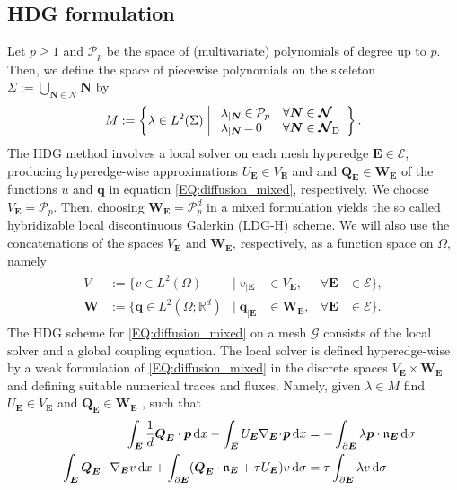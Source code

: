 \documentclass[a4paper, english, 12pt, reqno, draft]{amsart}
\theoremstyle{definition}
\theoremstyle{remark}
\numberwithin{equation}{section}
\newcommand{\Graph}{\ensuremath{\boldsymbol{\mathcal G}}}
\newcommand{\SetEdge}{\ensuremath{\boldsymbol{\mathcal E}}}
\newcommand{\SetNode}{\ensuremath{\boldsymbol{\mathcal N}}}
\newcommand{\SetNodeDir}{\ensuremath{\SetNode_\textup D}}
\newcommand{\Edge}{{\ensuremath{\boldsymbol E}}}
\newcommand{\Node}{{\ensuremath{\boldsymbol N}}}
\newcommand{\Nabla}{\ensuremath{\nabla_\Edge}}
\newcommand{\Div}{\ensuremath{\Nabla\!\cdot\!}}
\newcommand{\Normal}{\ensuremath{\mathfrak n_\Edge}}
\newcommand{\skeletal}{\ensuremath{\Sigma}}
\newcommand{\skeletalSpace}{\ensuremath{M}}
\newcommand{\discElementSpace}{\ensuremath{V}}
\newcommand{\polynomials}{\ensuremath{\mathcal P}}
\renewcommand{\vec}[1]{\ensuremath{\boldsymbol{#1}}}
\newcommand{\dx}{\ensuremath{\, \textup d x}}
\newcommand{\ds}{\ensuremath{\, \textup d \sigma}}
\begin{document}
\subsection{HDG formulation}\label{SEC:HDG_form}
% 
Let $p\ge 1$ and $\polynomials_p$ be the space of (multivariate)
polynomials of degree up to $p$. Then, we define the space of piecewise polynomials on the skeleton $\skeletal := \bigcup_{\Node \in \SetNode} \Node$ by
% 
\begin{gather}\label{EQ:skeletal_space}
 \skeletalSpace := \left\{ \lambda \in L^2(\skeletal) \;\middle|\;
 \begin{array}{r@{\,}c@{\,}ll}
  \lambda_{|\Node} &\in& \polynomials_p & \forall \Node \in \SetNode\\
  \lambda_{|\Node} &=& 0 & \forall \Node \in \SetNodeDir    
 \end{array}
 \right\}.
\end{gather}
% 
The HDG method involves a local solver on each mesh hyperedge $\Edge \in \SetEdge$, producing hyperedge-wise approximations $U_\Edge \in V_\Edge$ and and $\vec Q_\Edge \in \vec W_\Edge$ of the functions $u$ and $\vec q$ in equation \eqref{EQ:diffusion_mixed}, respectively. We choose $V_\Edge = \polynomials_p$. Then, choosing $\vec W_\Edge = \polynomials_p^d$ in a mixed formulation yields the so called hybridizable local discontinuous Galerkin (LDG-H) scheme. We will also use the concatenations of the spaces $V_\Edge$ and $\vec W_\Edge$, respectively, as a function space on $\Omega$, namely
%
\begin{gather}\label{EQ:dg_spaces}
 \begin{aligned}
  \discElementSpace &:=\bigl\{ v \in L^2(\Omega) & \big|\;v_{|\Edge} &\in V_\Edge, &\forall \Edge &\in \SetEdge \bigr\},\\
  \vec W &:=\bigl\{ \vec q \in L^2(\Omega;\mathbb R^d) & \big|\;\vec q_{|\Edge} &\in \vec W_\Edge, &\forall \Edge &\in \SetEdge \bigr\}.
 \end{aligned}
\end{gather}
% 
The HDG scheme for \eqref{EQ:diffusion_mixed} on a mesh $\Graph$
consists of the local solver and a global coupling equation. The local solver is defined hyperedge-wise by a weak formulation
of \eqref{EQ:diffusion_mixed} in the discrete spaces
$V_\Edge \times \vec W_\Edge$ and defining suitable numerical traces and fluxes. Namely, given $\lambda \in \skeletalSpace$ find $U_\Edge \in V_\Edge$ and $\vec Q_\Edge \in \vec W_\Edge$ , such that
% 
\begin{subequations}\label{EQ:hdg_scheme}
 \begin{align}
  \int_\Edge \frac{1}{d} \vec Q_\Edge \cdot \vec p \dx - \int_\Edge U_\Edge \Div \vec p \dx & = - \int_{\partial \Edge} \lambda \vec p \cdot \Normal \ds \label{EQ:hdg_primary}\\
  - \int_\Edge \vec Q_\Edge \cdot \Nabla v \dx  + \int_{\partial \Edge} ( \vec Q_\Edge \cdot \Normal + \tau  U_\Edge ) v \ds
  & = \tau \int_{\partial \Edge} \lambda v \ds \label{EQ:hdg_flux}
 \end{align}
\end{subequations}
\end{document}
